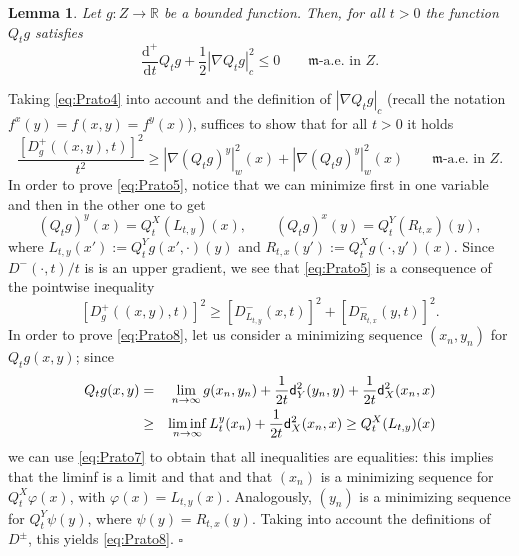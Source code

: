 \documentclass[reqno,11pt]{article}
\numberwithin{equation}{section}
\newcommand{\R}{\mathbb{R}}
\newcommand{\mm}{{\mbox{\boldmath$m$}}}
\newcommand{\sfd}{{\sf d}}
\renewcommand{\d}{{\mathrm d}}
\newcommand{\dt}{{\d t}}
\newenvironment{proof}{\removelastskip\par\medskip   %
\noindent{\em Proof.}
\rm}{\penalty-20\null\hfill$\square$\par\medbreak}
\newtheorem{lemma}[theorem]{Lemma}
\newcommand{\weakgrad}[1]{|\nabla #1|_w}                %
\newcommand{\cartgrad}[1]{|\nabla #1|_c}
\renewcommand{\mm}{\mathfrak m}
\begin{document}
\begin{lemma}\label{lem:hlimproved}
Let $g:Z\to\R$ be a bounded function. Then, for all $t>0$ the
function $Q_tg$ satisfies
\begin{equation}\label{eq:Prato1}
\frac{\d^+}{\dt}Q_tg+\frac{1}{2}\cartgrad{Q_t g}^2\leq
0\qquad\text{$\mm$-a.e.~in $Z$.}
\end{equation}
\end{lemma}
\begin{proof} Taking \eqref{eq:Prato4} into account and the definition of
$\cartgrad{Q_tg}$ (recall the notation $f^x(y)=f(x,y)=f^y(x)$),
suffices to show that for all $t>0$ it holds
\begin{equation}\label{eq:Prato5}
\frac{[D^+_g((x,y),t)]^2}{t^2}\geq
\weakgrad{(Q_tg)^y}^2(x)+\weakgrad{(Q_tg)^y}^2(x) \qquad
\text{$\mm$-a.e.~in $Z$.}
\end{equation}
In order to prove \eqref{eq:Prato5}, notice that we can minimize
first in one variable and then in the other one to get
\begin{equation}\label{eq:Prato7}
(Q_tg)^y(x)=Q_t^X(L_{t,y})(x),\qquad (Q_tg)^x(y)=Q_t^Y(R_{t,x})(y),
\end{equation}
where $L_{t,y}(x'):=Q_t^Yg(x',\cdot)(y)$ and
$R_{t,x}(y'):=Q_t^Xg(\cdot,y')(x)$. Since $D^-(\cdot,t)/t$ is is an
upper gradient, we see that \eqref{eq:Prato5} is a consequence of
the pointwise inequality
\begin{equation}\label{eq:Prato8}
[D^+_g((x,y),t)]^2\geq
[D^-_{L_{t,y}}(x,t)]^2+[D^-_{R_{t,x}}(y,t)]^2.
\end{equation}
In order to prove \eqref{eq:Prato8}, let us consider a minimizing
sequence $(x_n,y_n)$ for $Q_tg (x,y)$; since
\begin{eqnarray*}
Q_tg(x,y)&=&\lim_{n\to\infty}
g(x_n,y_n)+\frac{1}{2t}\sfd_Y^2(y_n,y)+\frac{1}{2t}\sfd_X^2(x_n,x)\\&\geq&
\liminf_{n\to\infty}L^y_t(x_n)+\frac{1}{2t}\sfd_X^2(x_n,x)\geq
Q^X_t(L_{t,y})(x)
\end{eqnarray*}
we can use \eqref{eq:Prato7} to obtain that all inequalities are
equalities: this implies that the liminf is a limit and that and
that $(x_n)$ is a minimizing sequence for $Q_t^X\varphi(x)$, with
$\varphi(x)=L_{t,y}(x)$. Analogously, $(y_n)$ is a minimizing
sequence for $Q_t^Y\psi(y)$, where $\psi(y)=R_{t,x}(y)$. Taking into
account the definitions of $D^\pm$, this yields \eqref{eq:Prato8}.
\end{proof}
\end{document}
